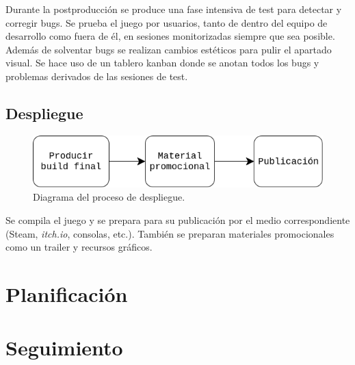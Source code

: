 Durante la postproducción se produce una fase intensiva de test para detectar y corregir bugs. Se prueba el juego por usuarios, tanto de dentro del equipo de desarrollo como fuera de él, en sesiones monitorizadas siempre que sea posible. Además de solventar bugs se realizan cambios estéticos para pulir el apartado visual. Se hace uso de un tablero kanban donde se anotan todos los bugs y problemas derivados de las sesiones de test.

\subsection{Despliegue}

\begin{figure}[H]
    \centering
    \includegraphics[scale=0.50]{img/deploy.drawio.png}
    \caption[Diagrama de despliegue]{Diagrama del proceso de despliegue.}
    \label{fig:deploy}
\end{figure}

Se compila el juego y se prepara para su publicación por el medio correspondiente (Steam, \textit{itch.io}, consolas, etc.). También se preparan materiales promocionales como un trailer y recursos gráficos.

\section{Planificación}

\section{Seguimiento}

